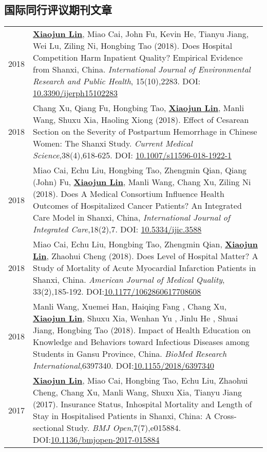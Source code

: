 \documentclass{resume}
\begin{document}
\subsection*{\textbf{国际同行评议期刊文章}}
\begin{longtable}{r p{14cm}}
2018 & \underline{\textbf{Xiaojun Lin}}, Miao Cai, John Fu, Kevin He, Tianyu Jiang, Wei Lu, Ziling Ni, Hongbing Tao (2018). Does Hospital Competition Harm Inpatient Quality? Empirical Evidence from Shanxi, China. \emph{International Journal of Environmental Research and Public Health}, 15(10),2283. DOI: \href{https://doi.org/10.3390/ijerph15102283}{10.3390/ijerph15102283}\\
2018 & Chang Xu, Qiang Fu, Hongbing Tao, \underline{\textbf{Xiaojun Lin}}, Manli Wang, Shuxu Xia, Haoling Xiong (2018). Effect of Cesarean Section on the Severity of Postpartum Hemorrhage in Chinese Women: The Shanxi Study. \emph{Current Medical Science},38(4),618-625. DOI: \href{https://doi.org/10.1007/s11596-018-1922-1}{10.1007/s11596-018-1922-1}\\
2018 & Miao Cai, Echu Liu, Hongbing Tao, Zhengmin Qian, Qiang (John) Fu, \underline{\textbf{Xiaojun Lin}}, Manli Wang, Chang Xu, Ziling Ni (2018). Does A Medical Consortium Influence Health Outcomes of Hospitalized Cancer Patients? An Integrated Care Model in Shanxi, China, \emph{International Journal of Integrated Care},18(2),7. DOI: \href{https://doi.org/10.5334/ijic.3588}{10.5334/ijic.3588}\\ 
2018 & Miao Cai, Echu Liu, Hongbing Tao, Zhengmin Qian, \underline{\textbf{Xiaojun Lin}}, Zhaohui Cheng (2018). Does Level of Hospital Matter? A Study of Mortality of Acute Myocardial Infarction Patients in Shanxi, China. \emph{American Journal of Medical Quality}, 33(2),185-192. DOI:\href{https://doi.org/10.1177/1062860617708608}{10.1177/1062860617708608}\\ 
2018 & Manli Wang, Xuemei Han, Haiqing Fang , Chang Xu, \underline{\textbf{Xiaojun Lin}}, Shuxu Xia, Wenhan Yu , Jinlu He , Shuai Jiang, Hongbing Tao (2018). Impact of Health Education on Knowledge and Behaviors toward Infectious Diseases among Students in Gansu Province, China. \emph{BioMed Research International},6397340. DOI:\href{https://doi.org/10.1155/2018/6397340}{10.1155/2018/6397340} \\
2017 &  \underline{\textbf{Xiaojun Lin}}, Miao Cai, Hongbing Tao, Echu Liu, Zhaohui Cheng, Chang Xu, Manli Wang, Shuxu Xia, Tianyu Jiang (2017). Insurance Status, Inhospital Mortality and Length of Stay in Hospitalised Patients in Shanxi, China: A Cross-sectional Study. \emph{BMJ Open},7(7),e015884. DOI:\href{https://doi.org/10.1136/bmjopen-2017-015884}{10.1136/bmjopen-2017-015884}\\

\end{longtable}
\end{document}

